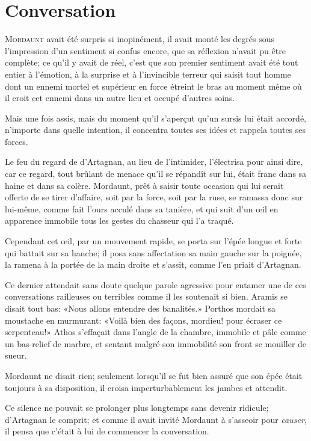 \chapter{Conversation}

\lettrine{M}{ordaunt} avait été surpris si inopinément, il avait monté les degrés sous l'impression d'un sentiment si confus encore, que sa réflexion n'avait pu être complète; ce qu'il y avait de réel, c'est que son premier sentiment avait été tout entier à l'émotion, à la surprise et à l'invincible terreur qui saisit tout homme dont un ennemi mortel et supérieur en force étreint le bras au moment même où il croit cet ennemi dans un autre lieu et occupé d'autres soins.

Mais une fois assis, mais du moment qu'il s'aperçut qu'un sursis lui était accordé, n'importe dans quelle intention, il concentra toutes ses idées et rappela toutes ses forces.

Le feu du regard de d'Artagnan, au lieu de l'intimider, l'électrisa pour ainsi dire, car ce regard, tout brûlant de menace qu'il se répandît sur lui, était franc dans sa haine et dans sa colère. Mordaunt, prêt à saisir toute occasion qui lui serait offerte de se tirer d'affaire, soit par la force, soit par la ruse, se ramassa donc sur lui-même, comme fait l'ours acculé dans sa tanière, et qui suit d'un œil en apparence immobile tous les gestes du chasseur qui l'a traqué.

Cependant cet œil, par un mouvement rapide, se porta sur l'épée longue et forte qui battait sur sa hanche; il posa sans affectation sa main gauche sur la poignée, la ramena à la portée de la main droite et s'assit, comme l'en priait d'Artagnan.

Ce dernier attendait sans doute quelque parole agressive pour entamer une de ces conversations railleuses ou terribles comme il les soutenait si bien. Aramis se disait tout bas: «Nous allons entendre des banalités.» Porthos mordait sa moustache en murmurant: «Voilà bien des façons, mordieu! pour écraser ce serpenteau!» Athos s'effaçait dans l'angle de la chambre, immobile et pâle comme un bas-relief de marbre, et sentant malgré son immobilité son front se mouiller de sueur.

Mordaunt ne disait rien; seulement lorsqu'il se fut bien assuré que son épée était toujours à sa disposition, il croisa imperturbablement les jambes et attendit.

Ce silence ne pouvait se prolonger plus longtemps sans devenir ridicule; d'Artagnan le comprit; et comme il avait invité Mordaunt à s'asseoir pour \textit{causer}, il pensa que c'était à lui de commencer la conversation.

